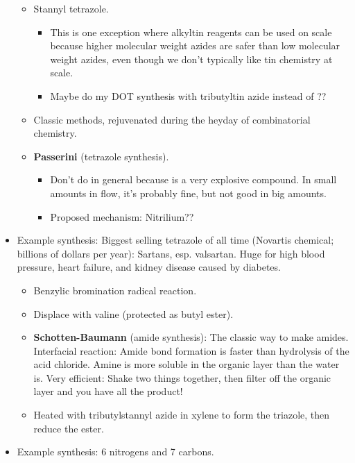 \documentclass[../notes.tex]{subfiles}
\begin{document}
\begin{itemize}
\begin{itemize}
\begin{itemize}
        \end{itemize}
        \item Stannyl tetrazole.
        \begin{itemize}
            \item This is one exception where alkyltin reagents can be used on scale because higher molecular weight azides are safer than low molecular weight azides, even though we don't typically like tin chemistry at scale.
            \item Maybe do my DOT synthesis with tributyltin azide instead of ??
        \end{itemize}
        \item Classic methods, rejuvenated during the heyday of combinatorial chemistry.
        \item \textbf{Passerini} (tetrazole synthesis).
        \begin{itemize}
            \item Don't do in general because  is a very explosive compound. In small amounts in flow, it's probably fine, but not good in big amounts.
            \item Proposed mechanism: Nitrilium??
        \end{itemize}
    \end{itemize}
    \item Example synthesis: Biggest selling tetrazole of all time (Novartis chemical; billions of dollars per year): Sartans, esp. valsartan. Huge for high blood pressure, heart failure, and kidney disease caused by diabetes.
    \begin{itemize}
        \item Benzylic bromination radical reaction.
        \item Displace with valine (protected as butyl ester).
        \item \textbf{Schotten-Baumann} (amide synthesis): The classic way to make amides. Interfacial reaction: Amide bond formation is faster than hydrolysis of the acid chloride. Amine is more soluble in the organic layer than the water is. Very efficient: Shake two things together, then filter off the organic layer and you have all the product!
        \item Heated with tributylstannyl azide in xylene to form the triazole, then reduce the ester.
    \end{itemize}
    \item Example synthesis: 6 nitrogens and 7 carbons.
    \begin{itemize}

\end{itemize}
\end{itemize}
\end{document}
